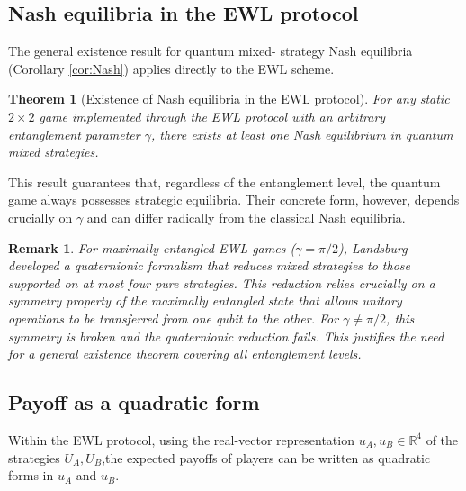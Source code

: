 \documentclass[11pt,a4paper,twoside]{article}
\newtheorem{rem}[definition]{Remark}
\newenvironment{remark}{\begin{rem}  \rm }{\end{rem}}
\newtheorem{theorem}{Theorem}
\begin{document}
\subsection{Nash equilibria in the EWL protocol}
The general existence result for quantum mixed-
strategy Nash equilibria (Corollary \ref{cor:Nash}) applies directly to the EWL scheme.

\begin{theorem}[Existence of Nash equilibria in the EWL protocol]\label{esistenza-EWL}
For any static $2\times2$ game implemented through the EWL protocol with an arbitrary entanglement parameter $\gamma$, there exists at least one Nash equilibrium in quantum mixed strategies.
\end{theorem}

This result guarantees that, regardless of the entanglement level, the quantum game always possesses strategic equilibria. 
Their concrete form, however, depends crucially on $\gamma$ and can differ radically from the classical Nash equilibria.
\begin{remark}\rm
For maximally entangled EWL games ($\gamma=\pi/2$), Landsburg \cite{landsburg} developed a quaternionic formalism that reduces mixed strategies to those supported on at most four pure strategies. This reduction relies crucially on a symmetry property of the maximally entangled state that allows unitary operations to be transferred from one qubit to the other. For $\gamma\neq\pi/2$, this symmetry is broken and the quaternionic reduction fails. This justifies the need for a general existence theorem covering all entanglement levels.
\end{remark}

\subsection{Payoff as a quadratic form}

Within the EWL protocol, using the real-vector representation \(u_A,u_B\in\mathbb{R}^4\) of the strategies \(U_A,U_B\),the expected payoffs of players can be written as quadratic forms in $u_A$ and $u_B$.
\end{document}

